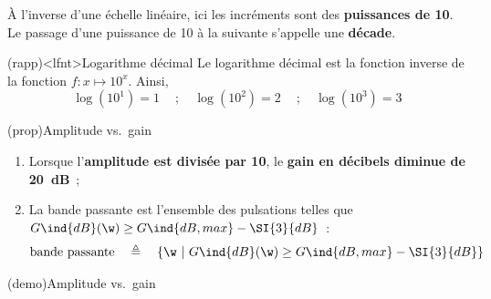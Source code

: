 \documentclass[../../main/main.tex]{subfiles}
\begin{document}
À l'inverse d'une échelle linéaire, ici les incréments sont des
\textbf{puissances de 10}. Le passage d'une puissance de 10 à la suivante
s'appelle une \textbf{décade}.

\begin{tcb*}(rapp)<lfnt>{Logarithme décimal}
	Le logarithme décimal est la fonction inverse de la fonction $f:x\mapsto
		10^{x}$. Ainsi,
	\[
		\log(10^{1}) = 1
		\quad~; \quad
		\log (10^{2}) = 2
		\quad~; \quad
		\log (10^{3}) = 3
	\]
\end{tcb*}

\begin{tcb*}(prop){Amplitude vs.\ gain}
	\begin{enumerate}
		\item Lorsque l'\textbf{amplitude est divisée par 10}, le \textbf{gain en
			      décibels diminue de \SI{20}{dB}}~;
		\item La bande passante est l'ensemble des pulsations telles que
		      $G\ind{dB}(\w) \geq G\ind{dB,max} - \SI{3}{dB}$~:
		      \[
			      \text{bande passante}
			      \quad \triangleq \quad
			      \{\w ~|~ G\ind{dB}(\w) \geq G\ind{dB, max}-\SI{3}{dB}\}
		      \]
	\end{enumerate}
\end{tcb*}
\begin{tcb*}[sidebyside](demo){Amplitude vs.\ gain}
	\begin{enumerate}
		\mitem
		\vspace{-15pt}
	\end{enumerate}
	\tcblower
	\begin{enumerate}[start=2]
		\mitem
		\psw{
			\small
			\begin{align*}
				\abs{\Hu(\w)}           & \geq \frac{\abs{\Hu}_{\max}}{\sqrt{2}}
				\\\Lra
				20 \log (\abs{\Hu(\w)}) & \geq 20 \log (\frac{\abs{\Hu}_{\max}}{\sqrt{2}})
				\\\Lra
				G\ind{dB}(\w)           & \geq
				\underbracket[1pt]{20 \log (\abs{\Hu}_{\max})}_{= G\ind{dB, max}} -
				\underbracket[1pt]{20 \log (\sqrt{2})}_{= \SI{3}{dB}}
				\qed
			\end{align*}
			\vspace{-15pt}
		}
	\end{enumerate}
\end{tcb*}
\end{document}
